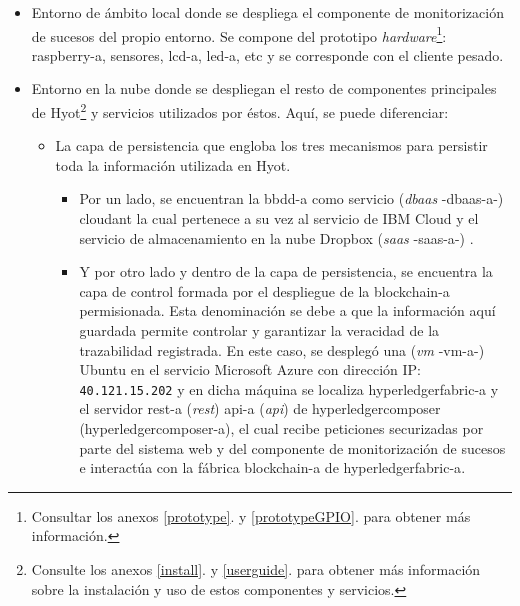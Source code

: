 \documentclass[12pt,a4paper, twoside]{report}
\begin{document}
	\begin{itemize}
		\item Entorno de ámbito local donde se despliega el componente de monitorización de sucesos del propio entorno. Se compone del prototipo \textit{hardware}\footnote{Consultar los anexos \ref{prototype}.  y \ref{prototypeGPIO}.  para obtener más información.}: \gls{raspberry-a}, sensores, \gls{lcd-a}, \gls{led-a}, etc y se corresponde con el cliente pesado.
		\item Entorno en la nube donde se despliegan el resto de componentes principales de Hyot\footnote{Consulte los anexos \ref{install}.  y \ref{userguide}.  para obtener más información sobre la instalación y uso de estos componentes y servicios.} y servicios utilizados por éstos. Aquí, se puede diferenciar:
		\begin{itemize}
			\item La capa de persistencia que engloba los tres mecanismos para persistir toda la información utilizada en Hyot.
			
			\begin{itemize}
				\item Por un lado, se encuentran la \gls{bbdd-a} como servicio (\textit{\gls{dbaas}} -\gls{dbaas-a}-) \gls{cloudant} la cual pertenece a su vez al servicio de IBM Cloud y el servicio de almacenamiento en la nube Dropbox (\textit{\gls{saas}} -\gls{saas-a}-) \cite{gonzalez:2011:TCCS}.
				
				\item Y por otro lado y dentro de la capa de persistencia, se encuentra la capa de control formada por el despliegue de la \gls{blockchain-a} permisionada. Esta denominación se debe a que la información aquí guardada permite controlar y garantizar la veracidad de la trazabilidad registrada. En este caso, se desplegó una (\textit{\gls{vm}} -\gls{vm-a}-) Ubuntu en el servicio Microsoft Azure con dirección IP: \texttt{40.121.15.202} y en dicha máquina se localiza \gls{hyperledgerfabric-a} y el servidor \gls{rest-a} (\textit{\gls{rest}}) \gls{api-a} (\textit{\gls{api}}) de \gls{hyperledgercomposer} (\gls{hyperledgercomposer-a}), el cual recibe peticiones securizadas por parte del sistema web y del componente de monitorización de sucesos e interactúa con la fábrica \gls{blockchain-a} de \gls{hyperledgerfabric-a}.				
			\end{itemize}  
		 				 		

\end{itemize}
\end{itemize}
\end{document}
